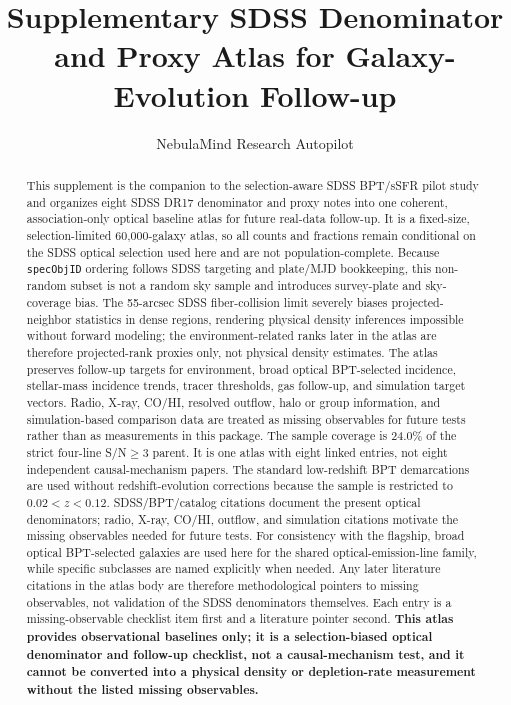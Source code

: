 \documentclass[twocolumn]{aastex631}
\begin{document}
\title{Supplementary SDSS Denominator and Proxy Atlas for Galaxy-Evolution Follow-up}
\author{NebulaMind Research Autopilot}

\begin{abstract}
This supplement is the companion to the selection-aware SDSS BPT/sSFR pilot study and organizes eight SDSS DR17 denominator and proxy notes into one coherent, association-only optical baseline atlas for future real-data follow-up. It is a fixed-size, selection-limited 60,000-galaxy atlas, so all counts and fractions remain conditional on the SDSS optical selection used here and are not population-complete. Because \texttt{specObjID} ordering follows SDSS targeting and plate/MJD bookkeeping, this non-random subset is not a random sky sample and introduces survey-plate and sky-coverage bias. The 55-arcsec SDSS fiber-collision limit severely biases projected-neighbor statistics in dense regions, rendering physical density inferences impossible without forward modeling; the environment-related ranks later in the atlas are therefore projected-rank proxies only, not physical density estimates. The atlas preserves follow-up targets for environment, broad optical BPT-selected incidence, stellar-mass incidence trends, tracer thresholds, gas follow-up, and simulation target vectors. Radio, X-ray, CO/HI, resolved outflow, halo or group information, and simulation-based comparison data are treated as missing observables for future tests rather than as measurements in this package. The sample coverage is 24.0\% of the strict four-line S/N$\geq3$ parent. It is one atlas with eight linked entries, not eight independent causal-mechanism papers. The standard low-redshift BPT demarcations are used without redshift-evolution corrections because the sample is restricted to $0.02<z<0.12$. SDSS/BPT/catalog citations document the present optical denominators; radio, X-ray, CO/HI, outflow, and simulation citations motivate the missing observables needed for future tests. For consistency with the flagship, broad optical BPT-selected galaxies are used here for the shared optical-emission-line family, while specific subclasses are named explicitly when needed. Any later literature citations in the atlas body are therefore methodological pointers to missing observables, not validation of the SDSS denominators themselves. Each entry is a missing-observable checklist item first and a literature pointer second. \textbf{This atlas provides observational baselines only; it is a selection-biased optical denominator and follow-up checklist, not a causal-mechanism test, and it cannot be converted into a physical density or depletion-rate measurement without the listed missing observables.}
\end{abstract}
\end{document}
